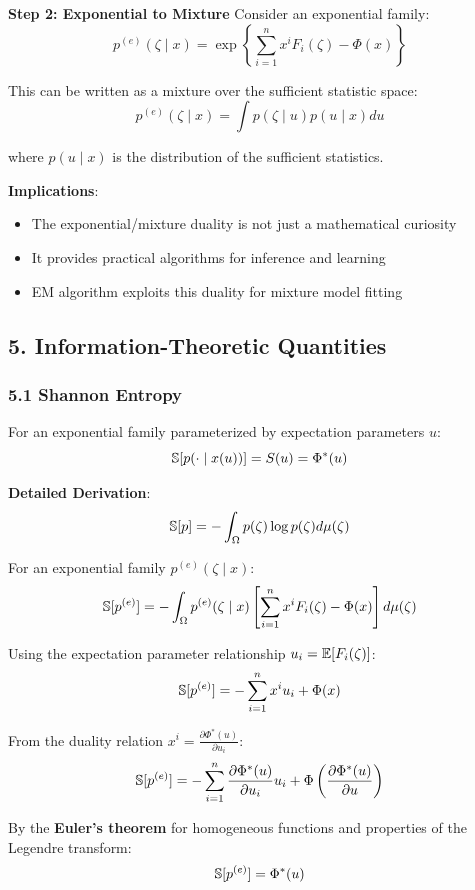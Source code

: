 \documentclass{amsart}
\let\originalmathbb\mathbb
\renewcommand{\mathbb}[1]{%
    \ifstrequal{#1}{1}{\mathbbm{#1}}{\originalmathbb{#1}}%
}
\theoremstyle{plain}
\theoremstyle{definition}
\theoremstyle{remark}
\begin{document}
\textbf{Step 2: Exponential to Mixture}
Consider an exponential family:
\[
p^{(e)}(\zeta \mid x) = \exp\left\{\sum_{i=1}^n x^i F_i(\zeta) - \Phi(x)\right\}
\]

This can be written as a mixture over the sufficient statistic space:
\[
p^{(e)}(\zeta \mid x) = \int p(\zeta \mid u) p(u \mid x) du
\]

where $p(u \mid x)$ is the distribution of the sufficient statistics.

\textbf{Implications}:

\begin{itemize}
	\item The exponential/mixture duality is not just a mathematical curiosity
	\item It provides practical algorithms for inference and learning
	\item EM algorithm exploits this duality for mixture model fitting
\end{itemize}

\subsection{5. Information-Theoretic Quantities}

\subsubsection{5.1 Shannon Entropy}

For an exponential family parameterized by expectation parameters $u$:
\[
\mathbb{S}[p(\cdot \mid x(u))] = S(u) = \Phi^{*}(u)
\]

\textbf{Detailed Derivation}:
\[
\mathbb{S}[p] = -\int_{\Omega} p(\zeta) \log p(\zeta) d\mu(\zeta)
\]

For an exponential family $p^{(e)}(\zeta \mid x)$:
\[
\mathbb{S}[p^{(e)}] = -\int_{\Omega} p^{(e)}(\zeta \mid x) \left[\sum_{i=1}^n x^i F_i(\zeta) - \Phi(x)\right] d\mu(\zeta)
\]

Using the expectation parameter relationship $u_i = \mathbb{E}[F_i(\zeta)]$:
\[
\mathbb{S}[p^{(e)}] = -\sum_{i=1}^n x^i u_i + \Phi(x)
\]

From the duality relation $x^i = \frac{\partial \Phi^*(u)}{\partial u_i}$:
\[
\mathbb{S}[p^{(e)}] = -\sum_{i=1}^n \frac{\partial \Phi^*(u)}{\partial u_i} u_i + \Phi\left(\frac{\partial \Phi^*(u)}{\partial u}\right)
\]

By the \textbf{Euler's theorem} for homogeneous functions and properties of the Legendre transform:
\[
\mathbb{S}[p^{(e)}] = \Phi^{*}(u)
\]
\end{document}
